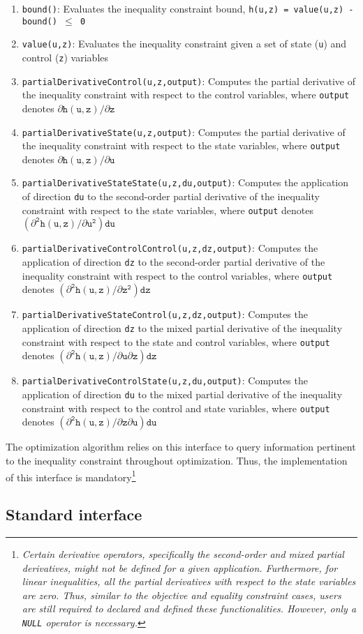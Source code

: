     \begin{enumerate}
    \item \texttt{bound()}: Evaluates the inequality constraint bound, \texttt{h(u,z) = value(u,z) - bound() $\mathtt{\le}$ 0}
    \item \texttt{value(u,z)}: Evaluates the inequality constraint given a set of state (\texttt{u}) and control (\texttt{z}) variables
    \item \texttt{partialDerivativeControl(u,z,output)}: Computes the partial derivative of the inequality constraint with respect to the control variables, where \texttt{output} denotes $\mathtt{\partial{h}(u,z)/\partial{z}}$ 
    \item \texttt{partialDerivativeState(u,z,output)}: Computes the partial derivative of the inequality constraint with respect to the state variables, where \texttt{output} denotes $\mathtt{\partial{h}(u,z)/\partial{u}}$ 
     \item \texttt{partialDerivativeStateState(u,z,du,output)}: Computes the application of direction \texttt{du} to the second-order partial derivative of the inequality constraint with respect to the state variables, where \texttt{output} denotes $\mathtt{(\partial^2{h}(u,z)/\partial{u}^2)du}$ 
     \item \texttt{partialDerivativeControlControl(u,z,dz,output)}: Computes the application of direction \texttt{dz} to the second-order partial derivative of the inequality constraint with respect to the control variables, where \texttt{output} denotes $\mathtt{(\partial^2{h}(u,z)/\partial{z}^2)dz}$ 
     \item \texttt{partialDerivativeStateControl(u,z,dz,output)}: Computes the application of direction \texttt{dz} to the mixed partial derivative of the inequality constraint with respect to the state and control variables, where \texttt{output} denotes $\mathtt{(\partial^2{h}(u,z)/\partial{u}\partial{z})dz}$ 
    \item \texttt{partialDerivativeControlState(u,z,du,output)}: Computes the application of direction \texttt{du} to the mixed partial derivative of the inequality constraint with respect to the control and state variables, where \texttt{output} denotes $\mathtt{(\partial^2{h}(u,z)/\partial{z}\partial{u})du}$ 
    \end{enumerate}
    
    The optimization algorithm relies on this interface to query information pertinent to the inequality constraint throughout optimization. Thus, the implementation of this interface is mandatory\footnote{\emph{Certain derivative operators, specifically the second-order and mixed partial derivatives, might not be defined for a given application. Furthermore, for linear inequalities, all the partial derivatives with respect to the state variables are zero. Thus, similar to the objective and equality constraint cases, users are still required to declared and defined these functionalities. However, only a \texttt{NULL} operator is necessary.}}
    
    \subsection{Standard interface}\label{subsec:InequalityStandardAPI}
